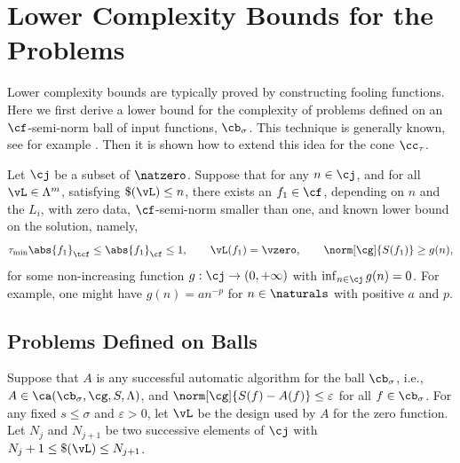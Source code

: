 \documentclass[]{elsarticle}
\theoremstyle{definition}
\theoremstyle{remark}
\newcommand{\Fnorm}[1]{\abs{#1}_{\cf}}
\newcommand{\Ftnorm}[1]{\abs{#1}_{\tcf}}
\newcommand{\Gnorm}[1]{\norm[\cg]{#1}}
\begin{document}
\section{Lower Complexity Bounds for the Problems} \label{LowBoundSec}
Lower complexity bounds are typically proved by constructing fooling functions.  Here we first derive a lower bound for the complexity of problems defined on an $\cf$-semi-norm ball of input functions, $\cb_\sigma$.  This technique is generally known, see for example \cite[p.\ 11--12]{TraWer98}.  Then it is shown how to extend this idea for the cone $\cc_{\tau}$. 

Let $\cj$ be a subset of $\natzero$.  Suppose that for any $n \in \cj$, and for all $\vL \in \Lambda^m$, satisfying $\$(\vL)\le n$, there exists an $f_1 \in \cf$, depending on $n$ and the $L_i$, with zero data, $\cf$-semi-norm smaller than one, and known lower bound on the solution, namely,
\begin{equation} \label{assumpfone}
\tau_{\min}\Ftnorm{f_1} \le \Fnorm{f_1} \le 1, \qquad \vL(f_1)= \vzero, \qquad
\norm[\cg]{S(f_1)} \ge g(n), 
\end{equation}
for some non-increasing function $g:\cj \to (0,+\infty)$ with $\inf_{n \in \cj} g(n)=0$.  For example, one might have $g(n)=a n^{-p}$ for $n \in \naturals$ with positive $a$ and $p$.

\subsection{Problems Defined on Balls} 
Suppose that $A$ is any successful automatic algorithm for the ball $\cb_{\sigma}$, i.e., $A \in \ca(\cb_{\sigma},\cg,S,\Lambda)$, and $\Gnorm{S(f)-A(f)}\le \varepsilon$ for all $f \in \cb_{\sigma}$.  For any fixed $s \le \sigma$ and $\varepsilon>0$, let $\vL$ be the design used by $A$ for the zero function.  Let $N_{j}$ and $N_{j+1}$ be two successive elements of $\cj$ with $N_{j}+1 \le \$(\vL) \le N_{j+1}$.
\end{document}
